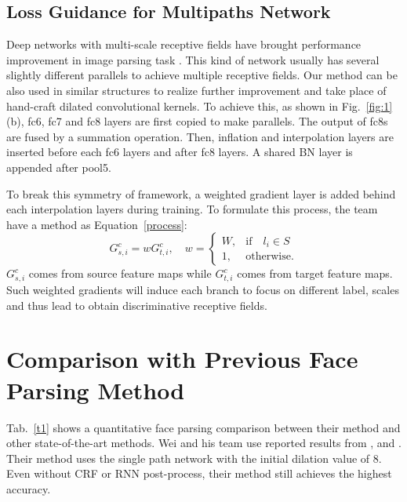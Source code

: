 \documentclass[10pt,twocolumn,letterpaper]{article}
\begin{document}
\subsection{Loss Guidance for Multipaths Network}

Deep networks with multi-scale receptive fields have brought performance improvement in image parsing task \cite{Chen2018DeepLab}. This kind of network usually has several slightly different parallels to achieve multiple receptive fields. Our method can be also used in similar structures to realize further improvement and take place of hand-craft dilated convolutional kernels.
To achieve this, as shown in Fig.~\ref{fig:1} (b), fc6, fc7 and fc8 layers are first copied to make parallels. The output of fc8s are fused by a summation operation. Then, inflation and interpolation layers are inserted before each fc6 layers and after fc8 layers. A shared BN layer is appended after pool5.

To break this symmetry of  framework, a weighted gradient layer is added behind each interpolation layers during training. To formulate this process, the team have a method as Equation~\ref{process}:
\begin{equation}
G_{s,i}^c=wG_{t,i}^c,\quad
w=
\begin{cases}
W, & \mbox{if} \quad l_i\in S \\
1, & \mbox{otherwise}.
\end{cases}   \label{process}
\end{equation}
$G_{s,i}^c$ comes from source feature maps while $G_{t,i}^c$ comes from target feature maps. Such weighted gradients will induce each branch to focus on different label, scales and thus lead to obtain discriminative receptive fields.

\section{Comparison with Previous Face Parsing Method}

Tab.~\ref{t1} shows a quantitative face parsing comparison between their method and other state-of-the-art methods. Wei and his team use reported results from \cite{Liu2011Nonparametric}, \cite{10.1109} and \cite{Liu2015Multi}. Their method uses the single path network with the initial dilation value of 8. Even without CRF or RNN post-process, their method still achieves the highest accuracy.
\end{document}
